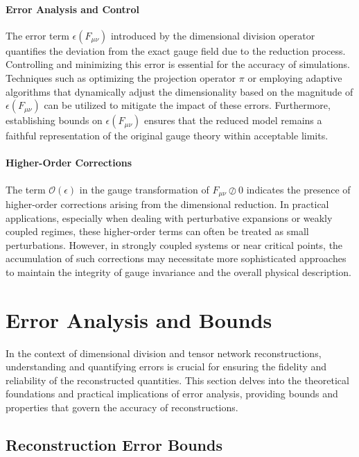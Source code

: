 \documentclass[sn-mathphys-num]{sn-jnl}
\theoremstyle{thmstyleone}
\theoremstyle{thmstyletwo}
\theoremstyle{thmstylethree}
\begin{document}
\paragraph{Error Analysis and Control}

The error term \( \epsilon(F_{\mu\nu}) \) introduced by the dimensional division operator quantifies the deviation from the exact gauge field due to the reduction process. Controlling and minimizing this error is essential for the accuracy of simulations. Techniques such as optimizing the projection operator \( \pi \) or employing adaptive algorithms that dynamically adjust the dimensionality based on the magnitude of \( \epsilon(F_{\mu\nu}) \) can be utilized to mitigate the impact of these errors. Furthermore, establishing bounds on \( \epsilon(F_{\mu\nu}) \) ensures that the reduced model remains a faithful representation of the original gauge theory within acceptable limits.

\paragraph{Higher-Order Corrections}

The term \( \mathcal{O}(\epsilon) \) in the gauge transformation of \( F_{\mu\nu} \oslash 0 \) indicates the presence of higher-order corrections arising from the dimensional reduction. In practical applications, especially when dealing with perturbative expansions or weakly coupled regimes, these higher-order terms can often be treated as small perturbations. However, in strongly coupled systems or near critical points, the accumulation of such corrections may necessitate more sophisticated approaches to maintain the integrity of gauge invariance and the overall physical description.

\section{Error Analysis and Bounds}

In the context of dimensional division and tensor network reconstructions, understanding and quantifying errors is crucial for ensuring the fidelity and reliability of the reconstructed quantities. This section delves into the theoretical foundations and practical implications of error analysis, providing bounds and properties that govern the accuracy of reconstructions.

\subsection{Reconstruction Error Bounds}
\end{document}
